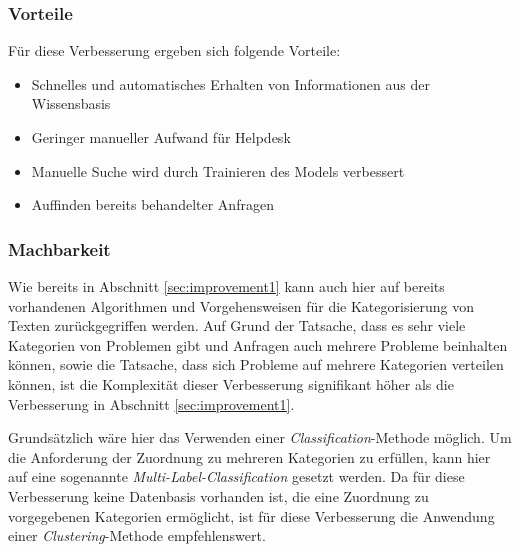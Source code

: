 \subsubsection{Vorteile}
Für diese Verbesserung ergeben sich folgende Vorteile:

\begin{itemize}
	\item Schnelles und automatisches Erhalten von Informationen aus der Wissensbasis
	\item Geringer manueller Aufwand für Helpdesk
	\item Manuelle Suche wird durch Trainieren des Models verbessert
	\item Auffinden bereits behandelter Anfragen
\end{itemize}

\subsubsection{Machbarkeit}
Wie bereits in Abschnitt \ref{sec:improvement1} kann auch hier auf bereits vorhandenen Algorithmen und Vorgehensweisen für die Kategorisierung von Texten zurückgegriffen werden. Auf Grund der Tatsache, dass es sehr viele Kategorien von Problemen gibt und Anfragen auch mehrere Probleme beinhalten können, sowie die Tatsache, dass sich Probleme auf mehrere Kategorien verteilen können, ist die Komplexität dieser Verbesserung signifikant höher als die Verbesserung in Abschnitt \ref{sec:improvement1}.

Grundsätzlich wäre hier das Verwenden einer \textit{Classification}-Methode möglich. Um die Anforderung der Zuordnung zu mehreren Kategorien zu erfüllen, kann hier auf eine sogenannte \textit{Multi-Label-Classification} gesetzt werden. Da für diese Verbesserung keine Datenbasis vorhanden ist, die eine Zuordnung zu vorgegebenen Kategorien ermöglicht, ist für diese Verbesserung die Anwendung einer \textit{Clustering}-Methode empfehlenswert.

